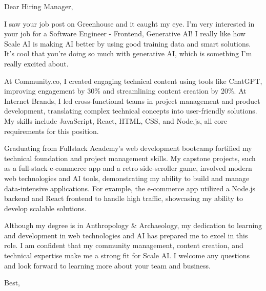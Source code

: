 \documentclass{letter}
\date{June 17, 2024}
\begin{document}
\begin{letter}{}
\opening{Dear Hiring Manager,}


I saw your job post on Greenhouse and it caught my eye. I'm very interested in your job for a Software Engineer - Frontend, Generative AI! I really like how Scale AI is making AI better by using good training data and smart solutions. It's cool that you're doing so much with generative AI, which is something I'm really excited about.

At Community.co, I created engaging technical content using tools like ChatGPT, improving engagement by 30\% and streamlining content creation by 20\%. At Internet Brands, I led cross-functional teams in project management and product development, translating complex technical concepts into user-friendly solutions. My skills include JavaScript, React, HTML, CSS, and Node.js, all core requirements for this position.

Graduating from Fullstack Academy's web development bootcamp fortified my technical foundation and project management skills. My capstone projects, such as a full-stack e-commerce app and a retro side-scroller game, involved modern web technologies and AI tools, demonstrating my ability to build and manage data-intensive applications. For example, the e-commerce app utilized a Node.js backend and React frontend to handle high traffic, showcasing my ability to develop scalable solutions.

Although my degree is in Anthropology \& Archaeology, my dedication to learning and development in web technologies and AI has prepared me to excel in this role. I am confident that my community management, content creation, and technical expertise make me a strong fit for Scale AI. I welcome any questions and look forward to learning more about your team and business.

\closing{Best,\\
 \\
}

\end{letter}
\end{document}
